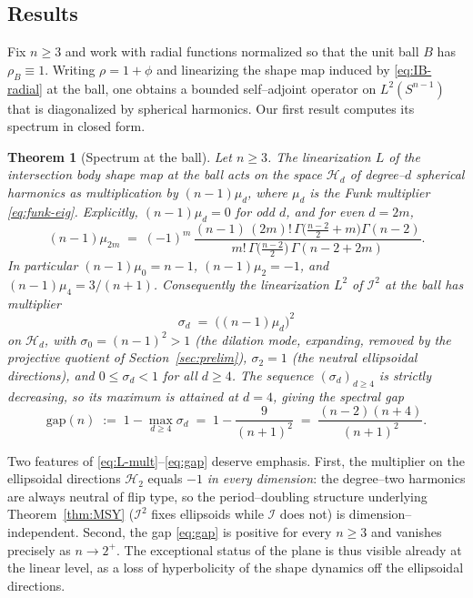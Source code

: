 \documentclass[10pt,a4paper]{amsart}
\newtheorem{theorem}{Theorem}[section]
\newcommand{\Sph}{S^{n-1}}
\newcommand{\IB}{\mathcal{I}}
\newcommand{\Hd}[1]{\mathcal{H}_{#1}}
\begin{document}
\subsection{Results}
Fix $n\ge 3$ and work with radial functions normalized so that the unit ball
$B$ has $\rho_B\equiv 1$. Writing $\rho = 1+\phi$ and linearizing the shape map
induced by \eqref{eq:IB-radial} at the ball, one obtains a bounded self--adjoint
operator on $L^2(\Sph)$ that is diagonalized by spherical harmonics. Our first
result computes its spectrum in closed form.


\begin{theorem}[Spectrum at the ball]\label{thm:spectrum}
Let $n\ge 3$. The linearization $L$ of the intersection body shape map at the
ball acts on the space $\Hd d$ of degree--$d$ spherical harmonics as
multiplication by $(n-1)\mu_d$, where $\mu_d$ is the Funk multiplier
\eqref{eq:funk-eig}. Explicitly, $(n-1)\mu_d=0$ for odd $d$, and for even
$d=2m$,
\begin{equation}\label{eq:L-mult}
   (n-1)\mu_{2m}
   \;=\;(-1)^m\,\frac{(n-1)\,(2m)!\,\Gamma\!\big(\tfrac{n-2}{2}+m\big)\Gamma(n-2)}
   {m!\,\Gamma\!\big(\tfrac{n-2}{2}\big)\,\Gamma(n-2+2m)} .
\end{equation}
In particular $(n-1)\mu_0 = n-1$, $(n-1)\mu_2 = -1$, and
$(n-1)\mu_4 = 3/(n+1)$. Consequently the linearization $L^2$ of $\IB^2$ at the
ball has multiplier
\[
   \sigma_d \;=\; \big((n-1)\mu_d\big)^2
\]
on $\Hd d$, with $\sigma_0=(n-1)^2>1$ (the dilation mode, expanding, removed by
the projective quotient of Section~\ref{sec:prelim}), $\sigma_2 = 1$ (the
neutral ellipsoidal directions), and $0\le \sigma_d < 1$ for all $d\ge 4$. The
sequence $(\sigma_d)_{d\ge 4}$ is strictly decreasing, so its maximum is
attained at $d=4$, giving the spectral gap
\begin{equation}\label{eq:gap}
   \mathrm{gap}(n)\;:=\;1-\max_{d\ge 4}\sigma_d
   \;=\;1-\frac{9}{(n+1)^2}\;=\;\frac{(n-2)(n+4)}{(n+1)^2}.
\end{equation}
\end{theorem}


Two features of \eqref{eq:L-mult}--\eqref{eq:gap} deserve emphasis. First, the
multiplier on the ellipsoidal directions $\Hd 2$ equals $-1$ \emph{in every
dimension}: the degree--two harmonics are always neutral of flip type, so the
period--doubling structure underlying Theorem~\ref{thm:MSY} ($\IB^2$ fixes
ellipsoids while $\IB$ does not) is dimension--independent. Second, the gap
\eqref{eq:gap} is positive for every $n\ge 3$ and vanishes precisely as
$n\to 2^+$. The exceptional status of the plane is thus visible already at the
linear level, as a loss of hyperbolicity of the shape dynamics off the
ellipsoidal directions.
\end{document}
